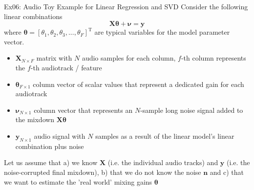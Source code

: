 \documentclass[mathserif, aspectratio=1610]{intbeamer}
\begin{document}
\begin{frame}{Ex06: Audio Toy Example for Linear Regression and SVD}
Consider the following linear combinations
$$\bm{X} \bm{\theta} + \bm{\nu} = \bm{y}$$
where $\bm{\theta}=[\theta_1, \theta_2, \theta_3, ..., \theta_{F}]^\mathrm{T}$ are typical variables for the model parameter vector.
%
\begin{itemize}
\item $\bm{X}_{N \times F}$ matrix with $N$ audio samples for each column, $f$-th column represents the $f$-th audiotrack / feature
\item $\bm{\theta}_{F \times 1}$ column vector of scalar values that represent a dedicated gain for each audiotrack
\item $\bm{\nu}_{N \times 1}$ column vector that represents an $N$-sample long noise signal added to the mixdown $\bm{X} \bm{\theta}$
\item $\bm{y}_{N \times 1}$ audio signal with $N$ samples as a result of the linear model's linear combination plus noise
\end{itemize}
%
Let us assume that a) we know $\bm{X}$ (i.e. the individual audio tracks) and $\bm{y}$ (i.e. the noise-corrupted final mixdown), b) that we do not know the noise $\bm{n}$ and c) that we want to estimate the 'real world' mixing gains $\bm{\theta}$
\end{frame}
\end{document}
